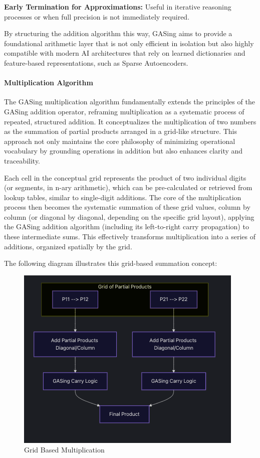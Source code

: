 \noindent\textbf{\textbf{Early Termination for Approximations:} } Useful in iterative reasoning processes or when full precision is not immediately required.


By structuring the addition algorithm this way, GASing aims to provide a foundational arithmetic layer that is not only efficient in isolation but also highly compatible with modern AI architectures that rely on learned dictionaries and feature-based representations, such as Sparse Autoencoders.
\paragraph{Multiplication Algorithm}

The GASing multiplication algorithm fundamentally extends the principles of the GASing addition operator, reframing multiplication as a systematic process of repeated, structured addition. It conceptualizes the multiplication of two numbers as the summation of partial products arranged in a grid-like structure. This approach not only maintains the core philosophy of minimizing operational vocabulary by grounding operations in addition but also enhances clarity and traceability.

Each cell in the conceptual grid represents the product of two individual digits (or segments, in n-ary arithmetic), which can be pre-calculated or retrieved from lookup tables, similar to single-digit additions. The core of the multiplication process then becomes the systematic summation of these grid values, column by column (or diagonal by diagonal, depending on the specific grid layout), applying the GASing addition algorithm (including its left-to-right carry propagation) to these intermediate sums. This effectively transforms multiplication into a series of additions, organized spatially by the grid.

The following diagram illustrates this grid-based summation concept:


\begin{figure}[H]
  \centering
  \includegraphics[width=\linewidth]{images/GridBasedMultiplication.png}
  \caption{Grid Based Multiplication}
  \label{fig:gridbasedmultiplication}
\end{figure}


